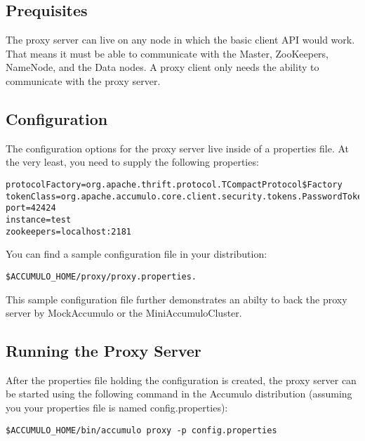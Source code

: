 \subsection{Prequisites}

The proxy server can live on any node in which the basic client API would work. That
means it must be able to communicate with the Master, ZooKeepers, NameNode, and the
Data nodes. A proxy client only needs the ability to communicate with the proxy server.


\subsection{Configuration}

The configuration options for the proxy server live inside of a properties file. At
the very least, you need to supply the following properties:

\begingroup\fontsize{8pt}{8pt}\selectfont\begin{verbatim}
protocolFactory=org.apache.thrift.protocol.TCompactProtocol$Factory
tokenClass=org.apache.accumulo.core.client.security.tokens.PasswordToken
port=42424
instance=test
zookeepers=localhost:2181
\end{verbatim}\endgroup

You can find a sample configuration file in your distribution:

\begingroup\fontsize{8pt}{8pt}\selectfont\begin{verbatim}
$ACCUMULO_HOME/proxy/proxy.properties.
\end{verbatim}\endgroup

This sample configuration file further demonstrates an abilty to back the proxy server
by MockAccumulo or the MiniAccumuloCluster.

\subsection{Running the Proxy Server}

After the properties file holding the configuration is created, the proxy server
can be started using the following command in the Accumulo distribution (assuming
you your properties file is named config.properties):

\begingroup\fontsize{8pt}{8pt}\selectfont\begin{verbatim}
$ACCUMULO_HOME/bin/accumulo proxy -p config.properties
\end{verbatim}\endgroup

